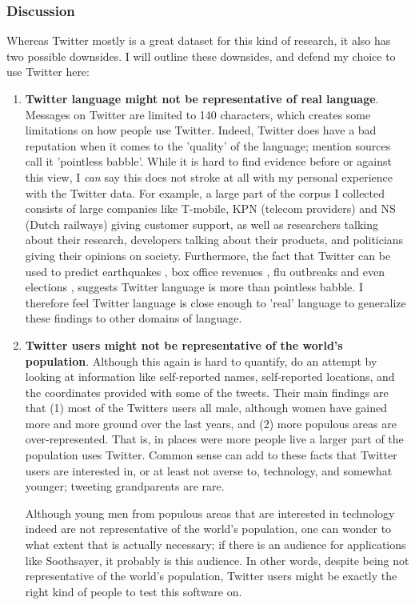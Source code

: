 \documentclass[11pt]{article}
\begin{document}
\subsubsection{Discussion}
Whereas Twitter mostly is a great dataset for this kind of research, it also has two possible downsides. I will outline these downsides, and defend my choice to use Twitter here:

\begin{enumerate}

\item \textbf{Twitter language might not be representative of real language}. Messages on Twitter are limited to 140 characters, which creates some limitations on how people use Twitter. Indeed, Twitter does have a bad reputation when it comes to the 'quality' of the language;  mention sources call it 'pointless babble'. While it is hard to find evidence before or against this view, I \emph{can} say this does not stroke at all with my personal experience with the Twitter data. For example, a large part of the corpus I collected consists of large companies like T-mobile, KPN (telecom providers) and NS (Dutch railways) giving customer support, as well as researchers talking about their research, developers talking about their products, and politicians giving their opinions on society. Furthermore, the fact that Twitter can be used to predict earthquakes , box office revenues , flu outbreaks  and even elections , suggests Twitter language is more than pointless babble. I therefore feel Twitter language is close enough to 'real' language to generalize these findings to other domains of language.

\item \textbf{Twitter users might not be representative of the world's population}. Although this again is hard to quantify,  do an attempt by looking at information like self-reported names, self-reported locations, and the coordinates provided with some of the tweets. Their main findings are that (1) most of the Twitters users all male, although women have gained more and more ground over the last years, and (2) more populous areas are over-represented. That is, in places were more people live a larger part of the population uses Twitter. Common sense can add to these facts that Twitter users are interested in, or at least not averse to, technology, and somewhat younger; tweeting grandparents are rare. 

Although young men from populous areas that are interested in technology indeed are not representative of the world's population, one can wonder to what extent that is actually necessary; if there is an audience for applications like Soothsayer, it probably is this audience. In other words, despite being not representative of the world's population, Twitter users might be exactly the right kind of people to test this software on.

\end{enumerate}
\end{document}
